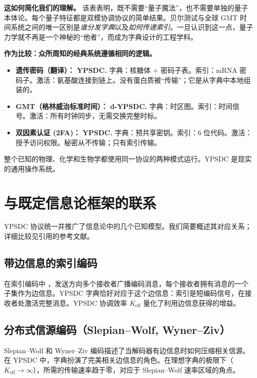 \documentclass[12pt,a4paper]{article}
\theoremstyle{remark}
\begin{document}
	\noindent
	\textbf{这如何简化我们的理解。}
	该表表明，既不需要“量子魔法”，也不需要单独的量子本体论。每个量子特征都是双模协调协议的简单结果。贝尔测试与全球 GMT 时间系统之间的唯一区别是\emph{谁分发字典}以及\emph{如何传递索引}。一旦认识到这一点，量子力学就不再是一个神秘的“他者”，而成为字典设计的工程学科。
	
	\textbf{作为比较：众所周知的经典系统遵循相同的逻辑。}
	\begin{itemize}
		\item \textbf{遗传密码（翻译）：} \textbf{YPSDC.} 字典：核糖体 + 密码子表。索引：mRNA 密码子。激活：氨基酸连接到链上。没有蛋白质被“传输”；它是从字典中本地组装的。
		\item \textbf{GMT（格林威治标准时间）：} \textbf{d-YPSDC.} 字典：时区图。索引：时间信号。激活：所有时钟同步，无需交换完整时标。
		\item \textbf{双因素认证 (2FA)：} \textbf{YPSDC.} 字典：预共享密钥。索引：6 位代码。激活：授予访问权限。秘密从不传输；只有索引传输。
	\end{itemize}
	
	整个已知的物理、化学和生物学都使用同一协议的两种模式运行。YPSDC 是现实的通用操作系统。
	
	\section{与既定信息论框架的联系}
	\label{sec:classical-connections}
	
	YPSDC 协议统一并推广了信息论中的几个已知模型。我们简要概述其对应关系；详细比较见引用的参考文献。
	
	\subsection*{带边信息的索引编码}
	在索引编码中 \cite{Birk1998,BarYossef2011}，发送方向多个接收者广播编码消息，每个接收者拥有消息的一个子集作为边信息。YPSDC 字典恰好对应于这个边信息：索引是短编码信号，在接收者处激活完整消息。YPSDC 协调效率 \(K_{\mathrm{eff}}\) 量化了利用边信息获得的增益。
	
	\subsection*{分布式信源编码（Slepian–Wolf, Wyner–Ziv）}
	Slepian–Wolf \cite{SlepianWolf1973} 和 Wyner–Ziv \cite{WynerZiv1976} 编码描述了当解码器有边信息时如何压缩相关信源。在 YPSDC 中，字典扮演了完美相关边信息的角色。在理想字典的极限下（\(K_{\mathrm{eff}} \to \infty\)），所需的传输速率趋于零，对应于 Slepian–Wolf 速率区域的角点。
	
\end{document}
